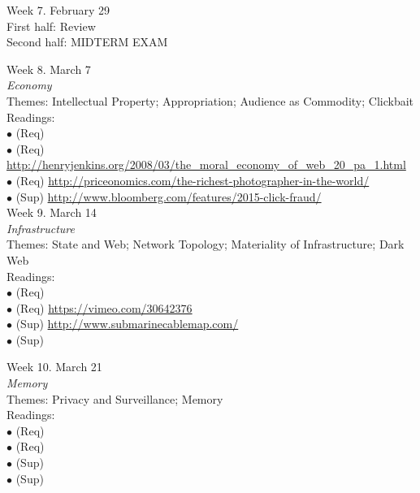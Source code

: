 \documentclass[10pt]{article}
\begin{document}
Week 7. February 29 \\
First half: Review \\
Second half: MIDTERM EXAM 

Week 8. March 7 \\
\textit{Economy} \\
Themes: Intellectual Property; Appropriation; Audience as Commodity; Clickbait \\
	Readings: \\
	$\bullet$ (Req) \\
	$\bullet$ (Req) \url{http://henryjenkins.org/2008/03/the_moral_economy_of_web_20_pa_1.html}\\
	$\bullet$ (Req) \url{http://priceonomics.com/the-richest-photographer-in-the-world/}\\
	$\bullet$ (Sup) \url{http://www.bloomberg.com/features/2015-click-fraud/}\\

Week 9. March 14 \\
\textit{Infrastructure} \\
Themes: State and Web; Network Topology; Materiality of Infrastructure; Dark Web \\
	Readings: \\
	$\bullet$ (Req) \\
	$\bullet$ (Req) \url{https://vimeo.com/30642376}\\
	$\bullet$ (Sup) \url{http://www.submarinecablemap.com/}\\
		$\bullet$ (Sup) 

Week 10. March 21 \\
\textit{Memory} \\
Themes: Privacy and Surveillance; Memory \\
	Readings: \\
	$\bullet$ (Req) \\
	$\bullet$ (Req) \\
	$\bullet$ (Sup) \\
	$\bullet$ (Sup) 
\end{document}
